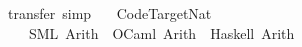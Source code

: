 \begin{isabellebody}
\ {\isacharparenleft}transfer{\isacharcomma}\ simp{\isacharparenright}{\isacharplus}%
\endisatagproof
{\isafoldproof}%
%
\isadelimproof
%
\endisadelimproof
\isanewline
\isanewline
{}\isamarkupfalse%
\isanewline
\ \ \ Code{\isacharunderscore}Target{\isacharunderscore}Nat\ {\isasymrightharpoonup}\isanewline
\ \ \ \ {\isacharparenleft}SML{\isacharparenright}\ Arith\ \ {\isacharparenleft}OCaml{\isacharparenright}\ Arith\ \ {\isacharparenleft}Haskell{\isacharparenright}\ Arith\isanewline
%
\isadelimtheory
\isanewline
%
\endisadelimtheory
%
\isatagtheory
{}\isamarkupfalse%
%
\endisatagtheory
{\isafoldtheory}%
%
\isadelimtheory
%
\endisadelimtheory
%
\end{isabellebody}%
